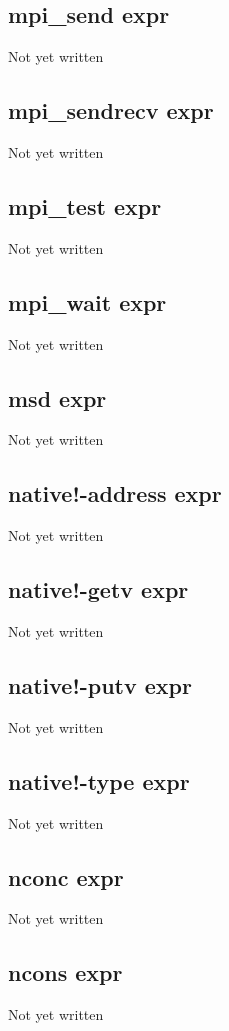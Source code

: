 \documentclass[a4paper,11pt]{article}
\begin{document}
{\subsection{\ttfamily mpi\_send expr}
   Not yet written

\subsection{\ttfamily mpi\_sendrecv expr}
   Not yet written

\subsection{\ttfamily mpi\_test expr}
   Not yet written

\subsection{\ttfamily mpi\_wait expr}
   Not yet written

\subsection{\ttfamily msd expr}
   Not yet written

\subsection{\ttfamily native!-address expr}
   Not yet written

\subsection{\ttfamily native!-getv expr}
   Not yet written

\subsection{\ttfamily native!-putv expr}
   Not yet written

\subsection{\ttfamily native!-type expr}
   Not yet written

\subsection{\ttfamily nconc expr}
   Not yet written

\subsection{\ttfamily ncons expr}
   Not yet written

}
\end{document}
